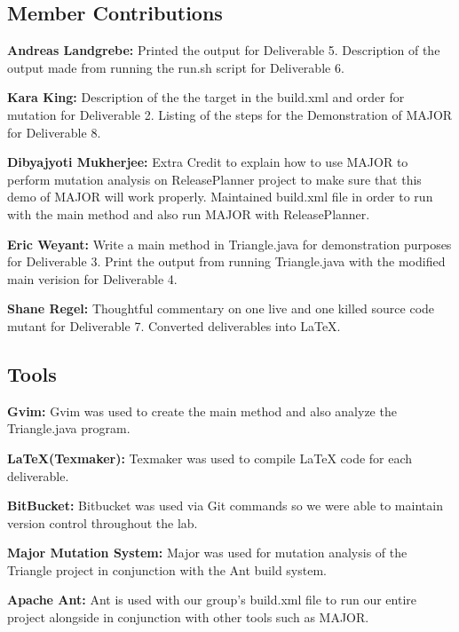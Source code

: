 \documentclass[12pt]{article}
\begin{document}
\subsection{Member Contributions}
\textbf{Andreas Landgrebe:}
Printed the output for Deliverable 5.
Description of the output made from running the run.sh script for Deliverable 6.

\textbf{Kara King:}
Description of the the target in the build.xml and order for mutation for Deliverable 2.
Listing of the steps for the Demonstration of MAJOR for Deliverable 8.

\textbf{Dibyajyoti Mukherjee:}
Extra Credit to explain how to use MAJOR to perform mutation analysis on ReleasePlanner project to make sure that this demo of MAJOR will work properly.
Maintained build.xml file in order to run with the main method and also run MAJOR with ReleasePlanner.

\textbf{Eric Weyant:}
Write a main method in Triangle.java for demonstration purposes for Deliverable 3. 
Print the output from running Triangle.java with the modified main verision for Deliverable 4.

\textbf{Shane Regel:}
Thoughtful commentary on one live and one killed source code mutant for Deliverable 7.
Converted deliverables into LaTeX.

\subsection{Tools}

\textbf{Gvim:} Gvim was used to create the main method and also analyze the Triangle.java program.

\textbf{LaTeX(Texmaker):} Texmaker was used to compile LaTeX code for each deliverable.

\textbf{BitBucket:} Bitbucket was used via Git commands so we were able to maintain version control throughout the lab.

\textbf{Major Mutation System:} Major was used for mutation analysis of the Triangle project in conjunction with the Ant build system. 

\textbf{Apache Ant:} Ant is used with our group$’$s build.xml file to run our entire project alongside in conjunction with other tools such as MAJOR.
\vspace*{.1in}
\end{document}
